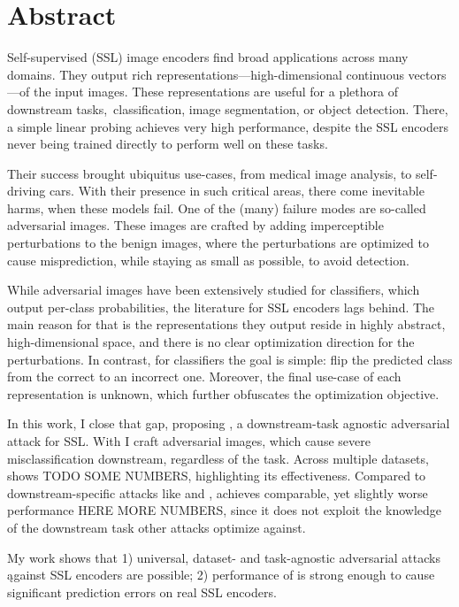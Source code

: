 \chapter*{Abstract}

Self-supervised (SSL) image encoders find broad applications across many domains. They output rich representations---high-dimensional continuous vectors---of the input images. These representations are useful for a plethora of downstream tasks,~\eg classification, image segmentation, or object detection. There, a simple linear probing achieves very high performance, despite the SSL encoders never being trained directly to perform well on these tasks.

Their success brought ubiquitus use-cases, from medical image analysis, to self-driving cars. With their presence in such critical areas, there come inevitable harms, when these models fail. One of the (many) failure modes are so-called adversarial images. These images are crafted by adding imperceptible perturbations to the benign images, where the perturbations are optimized to cause misprediction, while staying as small as possible, to avoid detection. 

While adversarial images have been extensively studied for classifiers, which output per-class probabilities, the literature for SSL encoders lags behind. The main reason for that is the representations they output reside in highly abstract, high-dimensional space, and there is no clear optimization direction for the perturbations. In contrast, for classifiers the goal is simple: flip the predicted class from the correct to an incorrect one. Moreover, the final use-case of each representation is unknown, which further obfuscates the optimization objective.

In this work, I close that gap, proposing \EmbedAttack, a downstream-task agnostic adversarial attack for SSL. With \EmbedAttack I craft adversarial images, which cause severe misclassification downstream, regardless of the task. Across multiple datasets, \EmbedAttack shows TODO SOME NUMBERS, highlighting its effectiveness. Compared to downstream-specific attacks like \PGD and \SegPGD, \EmbedAttack achieves comparable, yet slightly worse performance HERE MORE NUMBERS, since it does not exploit the knowledge of the downstream task other attacks optimize against.

My work shows that 1) universal, dataset- and task-agnostic adversarial attacks ągainst SSL encoders are possible; 2) performance of \EmbedAttack is strong enough to cause significant prediction errors on real SSL encoders.
